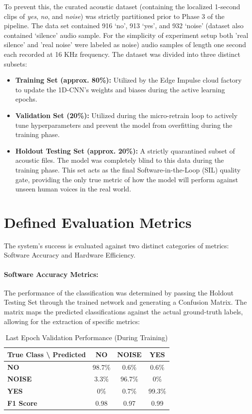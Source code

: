 \documentclass[11pt,a4paper,openany]{book}
\begin{document}
To prevent this, the curated acoustic dataset (containing the localized 1-second clips of \textit{yes}, \textit{no}, and \textit{noise}) was strictly partitioned prior to Phase 3 of the pipeline. The data set contained 916 `no', 913 `yes', and 932 `noise' (dataset also contained `silence' audio sample. For the simplicity of experiment setup both 'real silence' and 'real noise' were labeled as noise) audio samples of length one second each recorded at 16 KHz frequency. The dataset was divided into three distinct subsets:
\begin{itemize}
    \item \textbf{Training Set (approx. 80\%):} Utilized by the Edge Impulse cloud factory to update the 1D-CNN's weights and biases during the active learning epochs.
    \item \textbf{Validation Set (20\%):} Utilized during the micro-retrain loop to actively tune hyperparameters and prevent the model from overfitting during the training phase.
    \item \textbf{Holdout Testing Set (approx. 20\%):} A strictly quarantined subset of acoustic files. The model was completely blind to this data during the training phase. This set acts as the final Software-in-the-Loop (SIL) quality gate, providing the only true metric of how the model will perform against unseen human voices in the real world.
\end{itemize}

\section{Defined Evaluation Metrics}
The system's success is evaluated against two distinct categories of metrics: Software Accuracy and Hardware Efficiency.

\paragraph{Software Accuracy Metrics:}
The performance of the classification was determined by passing the Holdout Testing Set through the trained network and generating a Confusion Matrix. The matrix maps the predicted classifications against the actual ground-truth labels, allowing for the extraction of specific metrics:

\vspace{1em}

\begin{table}[!ht]
\centering
\caption{Last Epoch Validation Performance (During Training)}
\label{tab:val_perf}
\renewcommand{\arraystretch}{1.3}
\begin{tabular}{|l|c|c|c|}
\hline
\textbf{True Class \textbackslash{} Predicted} & \textbf{NO} & \textbf{NOISE} & \textbf{YES} \\ \hline
\textbf{NO} & 98.7\% & 0.6\% & 0.6\% \\ \hline
\textbf{NOISE} & 3.3\% & 96.7\% & 0\% \\ \hline
\textbf{YES} & 0\% & 0.7\% & 99.3\% \\ \hline
\textbf{F1 Score} & 0.98 & 0.97 & 0.99 \\ \hline
\end{tabular}
\end{table}
\end{document}
